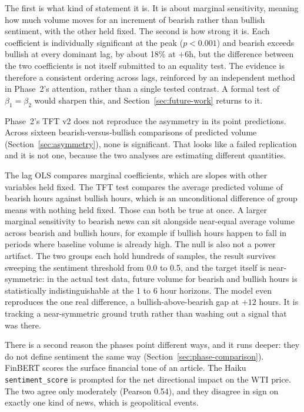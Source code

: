 The first is what kind of statement it is. It is about marginal sensitivity, meaning how much volume moves for an increment of bearish rather than bullish sentiment, with the other held fixed. The second is how strong it is. Each coefficient is individually significant at the peak ($p < 0.001$) and bearish exceeds bullish at every dominant lag, by about 18\% at $+6$h, but the difference between the two coefficients is not itself submitted to an equality test. The evidence is therefore a consistent ordering across lags, reinforced by an independent method in Phase~2's attention, rather than a single tested contrast. A formal test of $\beta_1 = \beta_2$ would sharpen this, and Section~\ref{sec:future-work} returns to it.

Phase~2's TFT v2 does not reproduce the asymmetry in its point predictions. Across sixteen bearish-versus-bullish comparisons of predicted volume (Section~\ref{sec:asymmetry}), none is significant. That looks like a failed replication and it is not one, because the two analyses are estimating different quantities.

The lag OLS compares marginal coefficients, which are slopes with other variables held fixed. The TFT test compares the average predicted volume of bearish hours against bullish hours, which is an unconditional difference of group means with nothing held fixed. Those can both be true at once. A larger marginal sensitivity to bearish news can sit alongside near-equal average volume across bearish and bullish hours, for example if bullish hours happen to fall in periods where baseline volume is already high. The null is also not a power artifact. The two groups each hold hundreds of samples, the result survives sweeping the sentiment threshold from 0.0 to 0.5, and the target itself is near-symmetric: in the actual test data, future volume for bearish and bullish hours is statistically indistinguishable at the 1 to 6 hour horizons. The model even reproduces the one real difference, a bullish-above-bearish gap at $+12$ hours. It is tracking a near-symmetric ground truth rather than washing out a signal that was there.

There is a second reason the phases point different ways, and it runs deeper: they do not define sentiment the same way (Section~\ref{sec:phase-comparison}). FinBERT scores the surface financial tone of an article. The Haiku \texttt{sentiment\_score} is prompted for the net directional impact on the WTI price. The two agree only moderately (Pearson 0.54), and they disagree in sign on exactly one kind of news, which is geopolitical events.

